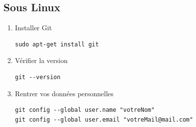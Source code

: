 \documentclass[french, 12pt]{article}%
\begin{document}
\subsection{Sous Linux}
\begin{enumerate}
\item Installer Git

\begin{lstlisting}[style=commande]
sudo apt-get install git 
\end{lstlisting}



\item Vérifier la version 

\begin{lstlisting}[style=commande]
git --version 
\end{lstlisting}


\item Rentrer vos données personnelles 

\begin{lstlisting}[style=commande]
git config --global user.name "votreNom"
git config --global user.email "votreMail@mail.com"
\end{lstlisting}


\end{enumerate}
\end{document}
